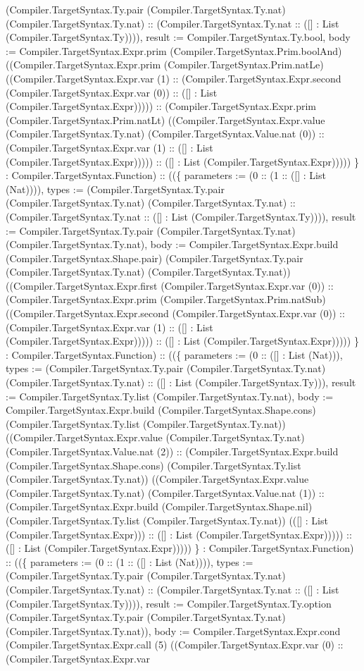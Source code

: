 \documentclass[11pt]{article}
\begin{document}
(Compiler.TargetSyntax.Ty.pair (Compiler.TargetSyntax.Ty.nat) (Compiler.TargetSyntax.Ty.nat) :: (Compiler.TargetSyntax.Ty.nat :: ([] : List (Compiler.TargetSyntax.Ty)))), result := Compiler.TargetSyntax.Ty.bool, body := Compiler.TargetSyntax.Expr.prim (Compiler.TargetSyntax.Prim.boolAnd) ((Compiler.TargetSyntax.Expr.prim (Compiler.TargetSyntax.Prim.natLe) ((Compiler.TargetSyntax.Expr.var (1) :: (Compiler.TargetSyntax.Expr.second (Compiler.TargetSyntax.Expr.var (0)) :: ([] : List (Compiler.TargetSyntax.Expr))))) :: (Compiler.TargetSyntax.Expr.prim (Compiler.TargetSyntax.Prim.natLt) ((Compiler.TargetSyntax.Expr.value (Compiler.TargetSyntax.Ty.nat) (Compiler.TargetSyntax.Value.nat (0)) :: (Compiler.TargetSyntax.Expr.var (1) :: ([] : List (Compiler.TargetSyntax.Expr))))) :: ([] : List (Compiler.TargetSyntax.Expr))))) \} : Compiler.TargetSyntax.Function) :: ((\{ parameters := (0 :: (1 :: ([] : List (Nat)))), types := (Compiler.TargetSyntax.Ty.pair (Compiler.TargetSyntax.Ty.nat) (Compiler.TargetSyntax.Ty.nat) :: (Compiler.TargetSyntax.Ty.nat :: ([] : List (Compiler.TargetSyntax.Ty)))), result := Compiler.TargetSyntax.Ty.pair (Compiler.TargetSyntax.Ty.nat) (Compiler.TargetSyntax.Ty.nat), body := Compiler.TargetSyntax.Expr.build (Compiler.TargetSyntax.Shape.pair) (Compiler.TargetSyntax.Ty.pair (Compiler.TargetSyntax.Ty.nat) (Compiler.TargetSyntax.Ty.nat)) ((Compiler.TargetSyntax.Expr.first (Compiler.TargetSyntax.Expr.var (0)) :: (Compiler.TargetSyntax.Expr.prim (Compiler.TargetSyntax.Prim.natSub) ((Compiler.TargetSyntax.Expr.second (Compiler.TargetSyntax.Expr.var (0)) :: (Compiler.TargetSyntax.Expr.var (1) :: ([] : List (Compiler.TargetSyntax.Expr))))) :: ([] : List (Compiler.TargetSyntax.Expr))))) \} : Compiler.TargetSyntax.Function) :: ((\{ parameters := (0 :: ([] : List (Nat))), types := (Compiler.TargetSyntax.Ty.pair (Compiler.TargetSyntax.Ty.nat) (Compiler.TargetSyntax.Ty.nat) :: ([] : List (Compiler.TargetSyntax.Ty))), result := Compiler.TargetSyntax.Ty.list (Compiler.TargetSyntax.Ty.nat), body := Compiler.TargetSyntax.Expr.build (Compiler.TargetSyntax.Shape.cons) (Compiler.TargetSyntax.Ty.list (Compiler.TargetSyntax.Ty.nat)) ((Compiler.TargetSyntax.Expr.value (Compiler.TargetSyntax.Ty.nat) (Compiler.TargetSyntax.Value.nat (2)) :: (Compiler.TargetSyntax.Expr.build (Compiler.TargetSyntax.Shape.cons) (Compiler.TargetSyntax.Ty.list (Compiler.TargetSyntax.Ty.nat)) ((Compiler.TargetSyntax.Expr.value (Compiler.TargetSyntax.Ty.nat) (Compiler.TargetSyntax.Value.nat (1)) :: (Compiler.TargetSyntax.Expr.build (Compiler.TargetSyntax.Shape.nil) (Compiler.TargetSyntax.Ty.list (Compiler.TargetSyntax.Ty.nat)) (([] : List (Compiler.TargetSyntax.Expr))) :: ([] : List (Compiler.TargetSyntax.Expr))))) :: ([] : List (Compiler.TargetSyntax.Expr))))) \} : Compiler.TargetSyntax.Function) :: ((\{ parameters := (0 :: (1 :: ([] : List (Nat)))), types := (Compiler.TargetSyntax.Ty.pair (Compiler.TargetSyntax.Ty.nat) (Compiler.TargetSyntax.Ty.nat) :: (Compiler.TargetSyntax.Ty.nat :: ([] : List (Compiler.TargetSyntax.Ty)))), result := Compiler.TargetSyntax.Ty.option (Compiler.TargetSyntax.Ty.pair (Compiler.TargetSyntax.Ty.nat) (Compiler.TargetSyntax.Ty.nat)), body := Compiler.TargetSyntax.Expr.cond (Compiler.TargetSyntax.Expr.call (5) ((Compiler.TargetSyntax.Expr.var (0) :: (Compiler.TargetSyntax.Expr.var 
\end{document}
